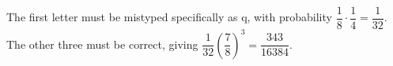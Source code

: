 The first letter must be mistyped specifically as q, with probability $\dfrac{1}{8}\cdot\dfrac{1}{4}=\dfrac{1}{32}$. The other three must be correct, giving $\dfrac{1}{32}(\dfrac{7}{8})^3=\boxed{\dfrac{343}{16384}}$.

